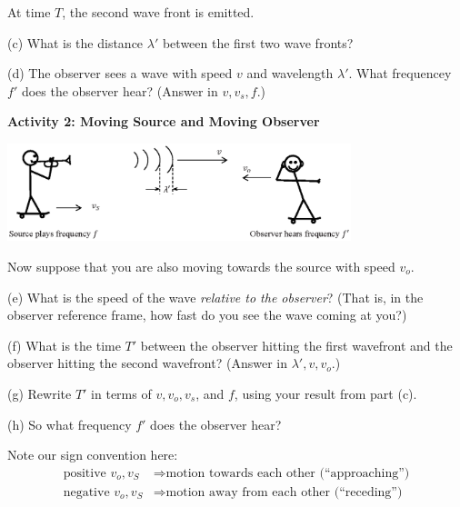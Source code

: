 At time $T$, the second wave front is emitted.

(c) What is the distance $\lambda'$ between the first two wave fronts?
\vspace{1.0in}

(d) The observer sees a wave with speed $v$ and wavelength $\lambda'$.  What frequencey $f'$ does the observer hear? (Answer in $v, v_s, f$.)
\vspace{1.0in}

\pagebreak
\textbf{Activity 2: Moving Source and Moving Observer}

\begin{center}
\includegraphics[width=0.75\textwidth]{doppler_shift/moving_observer.eps}
\end{center}

Now suppose that you are also moving towards the source with speed $v_o$.  

(e) What is the speed of the wave \textit{relative to the observer}?  (That is, in the observer reference frame, how fast do you see the wave coming at you?) 
\vspace{1.0in}

(f) What is the time $T'$ between the observer hitting the first wavefront and the observer hitting the second wavefront? (Answer in $\lambda', v, v_o$.)
\vspace{1.0in}

(g) Rewrite $T'$ in terms of $v, v_o, v_s$, and $f$, using your result from part (c).
\vspace{1.0in}

(h) So what frequency $f'$ does the observer hear?
\vspace{2.0in}

Note our sign convention here:
\begin{align*}
\textrm{positive } v_o, v_S &\Longrightarrow \textrm{motion towards each other (``approaching'')} \\
\textrm{negative } v_o, v_S &\Longrightarrow \textrm{motion away from each other (``receding'')} 
\end{align*}
